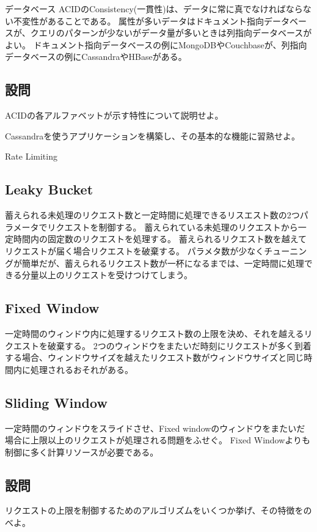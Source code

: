 \documentclass{jlreq}
\begin{document}
\begin{section-bib}{データベース}
  ACIDのConsistency(一貫性)は、データに常に真でなければならない不変性があることである\cite{ddia}。
  属性が多いデータはドキュメント指向データベースが、クエリのパターンが少ないがデータ量が多いときは列指向データベースがよい\cite{lc-databases}。
  ドキュメント指向データベースの例にMongoDBやCouchbaseが、列指向データベースの例にCassandraやHBaseがある。
  \subsection{設問}
  \begin{exercise}
  \item ACIDの各アルファベットが示す特性について説明せよ。
  \item Cassandraを使うアプリケーションを構築し、その基本的な機能に習熟せよ。
  \end{exercise}  
\end{section-bib}
\begin{section-bib}{Rate Limiting}
  \subsection{Leaky Bucket}
  蓄えられる未処理のリクエスト数と一定時間に処理できるリスエスト数の2つパラメータでリクエストを制御する\cite{sdi}。
  蓄えられている未処理のリクエストから一定時間内の固定数のリクエストを処理する。
  蓄えられるリクエスト数を越えてリクエストが届く場合リクエストを破棄する。
  パラメタ数が少なくチューニングが簡単だが、蓄えられるリクエスト数が一杯になるまでは、一定時間に処理できる分量以上のリクエストを受けつけてしまう。
  \subsection{Fixed Window}
  一定時間のウィンドウ内に処理するリクエスト数の上限を決め、それを越えるリクエストを破棄する。
  2つのウィンドウをまたいだ時刻にリクエストが多く到着する場合、ウィンドウサイズを越えたリクエスト数がウィンドウサイズと同じ時間内に処理されるおそれがある。
  \subsection{Sliding Window}
  一定時間のウィンドウをスライドさせ、Fixed windowのウィンドウをまたいだ場合に上限以上のリクエストが処理される問題をふせぐ。
  Fixed Windowよりも制御に多く計算リソースが必要である。
  \subsection{設問}
  \begin{exercise}
  \item リクエストの上限を制御するためのアルゴリズムをいくつか挙げ、その特徴をのべよ。
  \end{exercise}
\end{section-bib}
\end{document}

